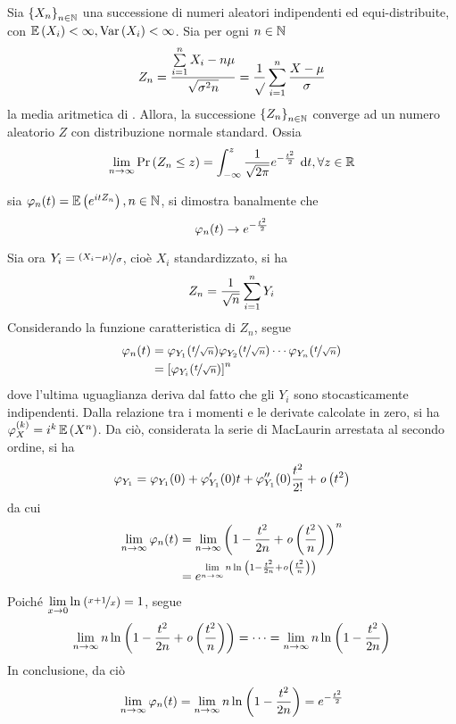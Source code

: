 \documentclass{subfiles}
\begin{document}
\begin{Theorem*}
    Sia \(\Sequence{X_{n}}\) una successione di numeri aleatori indipendenti ed equi-distribuite, con \(\Expected{X_{i}} < \infty, \Var{X_{i}} < \infty\).
    Sia per ogni \(n \in \operatorname{\mathbb{N}}\)
    \[
        Z_{n} = \Frac{\Sum{X_{i} - n\mu}{i = 1}[n]}{\sqrt{\sigma^{2} n}} = \Frac{1}{\sqrt{}} \Sum{\Frac{X - \mu}{\sigma}}{i = 1}[n]
    \]
    la media aritmetica di .
    Allora, la successione \(\Sequence{Z_{n}}\) converge ad un numero aleatorio \(Z\) con distribuzione normale standard.
    Ossia
    \[
        \Lim{n}{\infty}{\Prob{Z_{n} \le z}} = \Int{\Frac{1}{\sqrt{2\pi}} e^{-\Frac{t^{2}}{2}}}{t}[-\infty][z], \forall z \in \Real
    \]
    \begin{Proof*}
        sia \(\varphi_{n}(t) = \Expected{e^{itZ_{n}}}, n \in \Natural\), si dimostra banalmente che
        \[
            \varphi_{n}(t) \to e^{-\Frac{t^{2}}{2}}
        \]

        Sia ora \(Y_{i} = \Frac*{(X_{i} - \mu)}{\sigma}\), cioè \(X_{i}\) standardizzato, si ha
        \[
            Z_{n} = \Frac{1}{\sqrt{n}} \Sum{Y_{i}}{i = 1}[n]
        \]
        Considerando la funzione caratteristica di \(Z_{n}\), segue
        \[\begin{aligned}
                \varphi_{n}(t) & = \varphi_{Y_{1}}(\Frac*{t}{\sqrt{n}}) \varphi_{Y_{2}}(\Frac*{t}{\sqrt{n}}) \cdots \varphi_{Y_{n}}(\Frac*{t}{\sqrt{n}}) \\
                               & = \left[ \varphi_{Y_{i}}(\Frac*{t}{\sqrt{n}}) \right]^{n}
            \end{aligned}\]
        dove l'ultima uguaglianza deriva dal fatto che gli \(Y_{i}\) sono stocasticamente indipendenti.
        Dalla relazione tra i momenti e le derivate calcolate in zero, si ha \(\varphi_{X}^{(k)} = i^{k} \Expected{X^{n}}\).
        Da ciò, considerata la serie di MacLaurin arrestata al secondo ordine, si ha
        \[
            \varphi_{Y_{1}} = \varphi_{Y_{1}}(0) + \varphi_{Y_{1}}'(0)t + \varphi_{Y_{1}}''(0) \Frac{t^{2}}{2!} + \LittleO{t^{2}}
        \]
        da cui
        \[\begin{aligned}
                \Lim{n}{\infty}{\varphi_{n}(t)} & = \Lim{n}{\infty}{\left(1 - \Frac{t^{2}}{2n} + \LittleO{\Frac{t^{2}}{n}}\right)^{n}} \\
                                                & = e^{\Lim{n}{\infty}{n \Log*{1 - \Frac{t^{2}}{2n} + \LittleO{\Frac{t^{2}}{n}}}}}
            \end{aligned}\]
        Poiché \(\Lim{x}{0}{\Log*{\Frac*{x + 1}{x}}} = 1\), segue
        \[
            \Lim{n}{\infty}{n \Log*{1 - \Frac{t^{2}}{2n} + \LittleO{\Frac{t^{2}}{n}}}} = \cdots = \Lim{n}{\infty}{n \Log*{1 - \Frac{t^{2}}{2n}}}
        \]
        In conclusione, da ciò
        \[
            \Lim{n}{\infty}{\varphi_{n}(t)} = \Lim{n}{\infty}{n \Log*{1 - \Frac{t^{2}}{2n}}} = e^{-\Frac{t^{2}}{2}}
        \]
    \end{Proof*}
\end{Theorem*}
\end{document}
